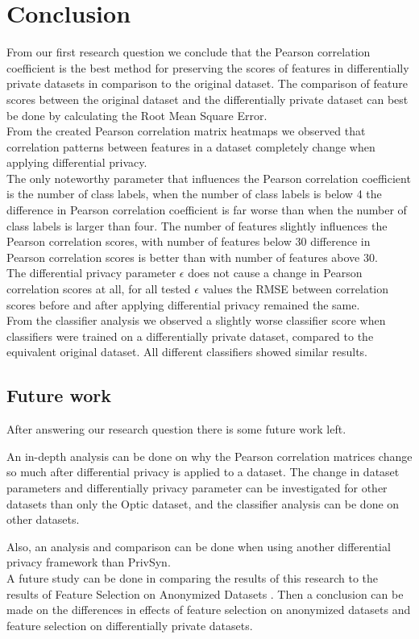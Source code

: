 \chapter{Conclusion}
\label{ch:conclusion}

From our first research question we conclude that the Pearson correlation coefficient is the best method for preserving the scores of features in differentially private datasets in comparison to the original dataset. The comparison of feature scores between the original dataset and the differentially private dataset can best be done by calculating the Root Mean Square Error.\\

From the created Pearson correlation matrix heatmaps we observed that correlation patterns between features in a dataset completely change when applying differential privacy.\\

The only noteworthy parameter that influences the Pearson correlation coefficient is the number of class labels, when the number of class labels is below 4 the difference in Pearson correlation coefficient is far worse than when the number of class labels is larger than four.
The number of features slightly influences the Pearson correlation scores, with number of features below 30 difference in Pearson correlation scores is better than with number of features above 30.\\

The differential privacy parameter $\epsilon$ does not cause a change in Pearson correlation scores at all, for all tested $\epsilon$ values the RMSE between correlation scores before and after applying differential privacy remained the same. \\

From the classifier analysis we observed a slightly worse classifier score when classifiers were trained on a differentially private dataset, compared to the equivalent original dataset. All different classifiers showed similar results.

\section{Future work}
After answering our research question there is some future work left. 

An in-depth analysis can be done on why the Pearson correlation matrices change so much after differential privacy is applied to a dataset. The change in dataset parameters and differentially privacy parameter can be investigated for other datasets than only the Optic dataset, and the classifier analysis can be done on other datasets.

Also, an analysis and comparison can be done when using another differential privacy framework than PrivSyn.\\

A future study can be done in comparing the results of this research to the results of Feature Selection on Anonymized Datasets \cite{originalpaper}. Then a conclusion can be made on the differences in effects of feature selection on anonymized datasets and feature selection on differentially private datasets.